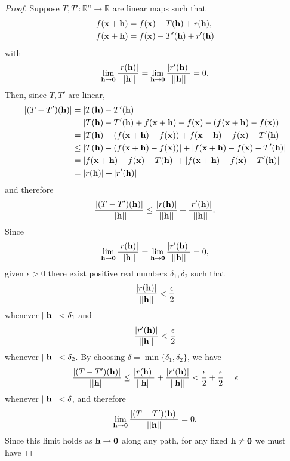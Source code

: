 \documentclass[12pt,letterpaper,reqno]{article}
\numberwithin{equation}{section}
\newcommand{\bh}{{\bf h}}
\newcommand{\R}{\ensuremath{\mathbb R}}
\newcommand{\zv}{{\bf 0}}
\newcommand{\bx}{{\bf x}}
\begin{document}
{\begin{proof}
	Suppose $T,T':\R^n \to \R$ are linear maps such that 
	\begin{align*}
		f(\bx+\bh)&=f(\bx)+T(\bh)+r(\bh), \\
		f(\bx+\bh)&=f(\bx)+T'(\bh)+r'(\bh)
	\end{align*}
	with
	\begin{align*}
		\lim_{\bh \to \zv}\frac{|r(\bh)|}{||\bh||}=\lim_{\bh \to \zv}\frac{|r'(\bh)|}{||\bh||}=0.
	\end{align*}
	Then, since $T,T'$ are linear,
	\begin{align*}
		|(T-T')(\bh)|&=|T(\bh)-T'(\bh)| \\
		&=|T(\bh)-T'(\bh)+f(\bx+\bh)-f(\bx)-(f(\bx+\bh)-f(\bx))| \\
		&=|T(\bh)-(f(\bx+\bh)-f(\bx))+f(\bx+\bh)-f(\bx)-T'(\bh)| \\
		&\leq |T(\bh)-(f(\bx+\bh)-f(\bx))|+|f(\bx+\bh)-f(\bx)-T'(\bh)| \\
		&= |f(\bx+\bh)-f(\bx)-T(\bh)|+|f(\bx+\bh)-f(\bx)-T'(\bh)| \\
		&=|r(\bh)|+|r'(\bh)|
	\end{align*}
	and therefore
\begin{align*}
	\frac{|(T-T')(\bh)|}{||\bh||}\leq \frac{|r(\bh)|}{||\bh||}+ \frac{|r'(\bh)|}{||\bh||}.
\end{align*}
	Since 
\begin{align*}
		\lim_{\bh \to \zv}\frac{|r(\bh)|}{||\bh||}=\lim_{\bh \to \zv}\frac{|r'(\bh)|}{||\bh||}=0,
	\end{align*}	
given $\epsilon>0$ there exist positive real numbers $\delta_1,\delta_2$ such that 
	\begin{align*}
		\frac{|r(\bh)|}{||\bh||}<\frac{\epsilon}{2}
	\end{align*}
	whenever $||\bh||<\delta_1$ and 
	\begin{align*}
		\frac{|r'(\bh)|}{||\bh||}<\frac{\epsilon}{2}
	\end{align*}
	whenever $||\bh||<\delta_2$. By choosing $\delta=\min\{\delta_1,\delta_2\}$, we have
	\begin{align*}
		\frac{|(T-T')(\bh)|}{||\bh||}\leq \frac{|r(\bh)|}{||\bh||}+ \frac{|r'(\bh)|}{||\bh||}<\frac{\epsilon}{2}+\frac{\epsilon}{2}=\epsilon
	\end{align*}
	whenever $||\bh||<\delta$, and therefore
	\begin{align*}
		\lim_{\bh \to \zv}\frac{|(T-T')(\bh)|}{||\bh||}=0.
	\end{align*}
Since this limit holds as $\bh \to \zv$ along any path, for any fixed $\bh \neq \zv$ we must have

\end{proof}}
\end{document}
